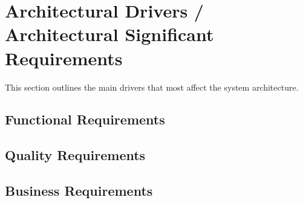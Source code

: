 \section{Architectural Drivers / Architectural Significant Requirements}
	This section outlines the main drivers that most affect the system architecture.
	
	\subsection{Functional Requirements}
	
	\subsection{Quality Requirements}
	
	\subsection{Business Requirements}